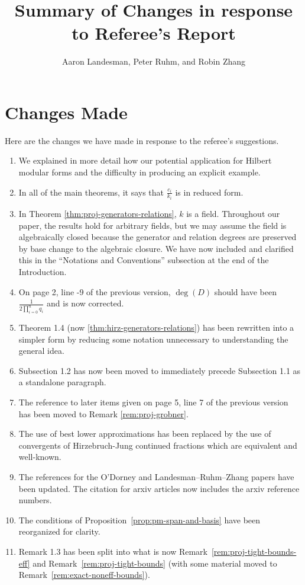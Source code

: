 \documentclass[10 pt]{amsart}
\title{Summary of Changes in response to Referee's Report}
\author{Aaron Landesman, Peter Ruhm, and Robin Zhang}
\theoremstyle{plain}
\theoremstyle{definition}
\theoremstyle{remark}
\numberwithin{equation}{section}
\begin{document}
\maketitle
\section{Changes Made}
Here are the changes we have made in response to the referee's suggestions.
\begin{enumerate}
	\item {} We explained
		in more detail how our potential application
		for Hilbert modular forms and the difficulty in producing
		an explicit example.
	\item In all of the main theorems, it says that $\frac{c_i}{k_i}$ is in reduced form. 
	\item In Theorem \autoref{thm:proj-generators-relations}, $k$ is a field. Throughout our paper, the results hold for arbitrary fields, but we may assume the field is algebraically closed because the generator and relation degrees are preserved by base change to the algebraic closure. We have now included and clarified this in the ``Notations and Conventions'' subsection at the end of the Introduction.
	\item On page 2, line -9 of the previous version, $\deg(D)$ should have been $\frac{1}{2 \prod_{i=0}^n q_i}$ and is now corrected.
	\item Theorem 1.4 (now \autoref{thm:hirz-generators-relations}) has been rewritten into a simpler form by reducing some
	notation unnecessary to understanding the general idea.
	\item Subsection 1.2 has now been moved to immediately precede Subsection 1.1 as a standalone paragraph.
	\item The reference to later items given on page 5, line 7 of the previous version
		has been moved to Remark \autoref{rem:proj-grobner}.
\item The use of best lower approximations has been replaced by the use of
convergents of Hirzebruch-Jung continued fractions which are equivalent and
well-known.
\item The references for the O'Dorney and Landesman--Ruhm--Zhang papers have been updated. The citation for arxiv articles now includes the arxiv reference numbers.
\item The conditions of Proposition~\autoref{prop:pm-span-and-basis} have been reorganized for clarity.
\item Remark 1.3 has been split into what is now Remark~\autoref{rem:proj-tight-bounds-eff} and Remark~\autoref{rem:proj-tight-bounds} (with
some material moved to Remark~\autoref{rem:exact-noneff-bounds}).

\end{enumerate}
\end{document}
